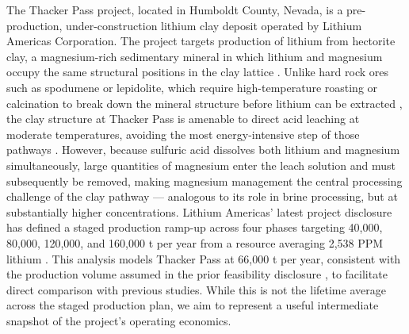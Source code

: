 The Thacker Pass project, located in Humboldt County, Nevada, is a pre-production, under-construction lithium clay deposit operated by Lithium Americas Corporation. The project targets production of lithium from hectorite clay, a magnesium-rich sedimentary mineral in which lithium and magnesium occupy the same structural positions in the clay lattice \cite{castorLithiumRichClaystoneMcDermitt2020, zhaoRecentAdvancesLithium2023}. Unlike hard rock ores such as spodumene or lepidolite, which require high-temperature roasting or calcination to break down the mineral structure before lithium can be extracted \cite{gaoLithiumExtractionHard2023}, the clay structure at Thacker Pass is amenable to direct acid leaching at moderate temperatures, avoiding the most energy-intensive step of those pathways \cite{royLithiumClayAssessing2024}. However, because sulfuric acid dissolves both lithium and magnesium simultaneously, large quantities of magnesium enter the leach solution and must subsequently be removed, making magnesium management the central processing challenge of the clay pathway — analogous to its role in brine processing, but at substantially higher concentrations. Lithium Americas' latest project disclosure has defined a staged production ramp-up across four phases targeting 40,000, 80,000, 120,000, and 160,000 t  per year from a resource averaging 2,538 PPM lithium \cite{sgscanadaincSK1300Technical2024}. This analysis models Thacker Pass at 66,000 t  per year, consistent with the production volume assumed in the prior feasibility disclosure \cite{rothFeasibilityStudyNational2022}, to facilitate direct comparison with previous studies. While this is not the lifetime average across the staged production plan, we aim to represent a useful intermediate snapshot of the project's operating economics.

